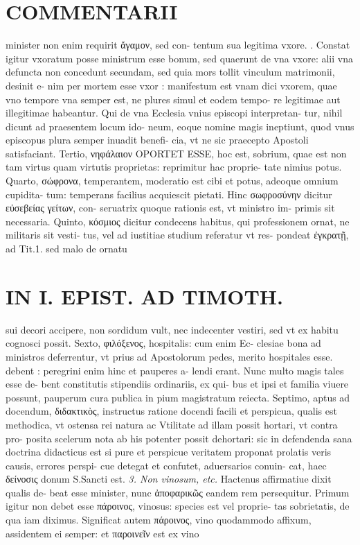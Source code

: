 \documentclass{article}
\begin{document}
\begin{pages}
\section*{COMMENTARII }\pstart minister non enim requirit ἄγαμον, sed con- tentum sua legitima vxore. .  \pend\pstart Constat igitur vxoratum posse ministrum esse bonum, sed quaerunt de vna vxore: alii vna defuncta non concedunt secundam, sed quia mors tollit vinculum matrimonii, desinit e- nim per mortem esse vxor : manifestum est vnam dici vxorem, quae vno tempore vna semper est, ne plures simul et eodem tempo- re legitimae aut illegitimae habeantur. Qui de vna Ecclesia vnius episcopi interpretan- tur, nihil dicunt ad praesentem locum ido- neum, eoque nomine magis ineptiunt, quod vnus episcopus plura semper inuadit benefi- cia, vt ne sic praecepto Apostoli satisfaciant.  \pend\pstart Tertio, νηφάλαιον OPORTET ESSE, hoc est, sobrium, quae est non tam virtus quam virtutis proprietas: reprimitur hac proprie- tate nimius potus.  \pend\pstart Quarto, σώφρονα, temperantem, moderatio est cibi et potus, adeoque omnium cupidita- tum: temperans facilius acquiescit pietati. Hinc σωφροσύνην dicitur εὐσεβείας γείτων, con- seruatrix quoque rationis est, vt ministro im- primis sit necessaria.  \pend\pstart Quinto, κόσμιος dicitur condecens habitus, qui professionem ornat, ne militaris sit vesti- tus, vel ad iustitiae studium referatur vt res- pondeat ἐγκρατῇ, ad Tit.1. sed malo de ornatu  \pend
\section*{IN I. EPIST. AD TIMOTH. }
\marginpar{[ p.65 ]}\pstart sui decori accipere, non sordidum vult, nec indecenter vestiri, sed vt ex habitu cognosci possit.  \pend\pstart Sexto, φιλόξενος, hospitalis: cum enim Ec- clesiae bona ad ministros deferrentur, vt prius ad Apostolorum pedes, merito hospitales esse. debent : peregrini enim hinc et pauperes a- lendi erant. Nunc multo magis tales esse de- bent constitutis stipendiis ordinariis, ex qui- bus et ipsi et familia viuere possunt, pauperum cura publica in pium magistratum reiecta. Septimo, aptus ad docendum, διδακτικὸς, instructus ratione docendi facili et perspicua, qualis est methodica, vt ostensa rei natura ac Vtilitate ad illam possit hortari, vt contra pro- posita scelerum nota ab his potenter possit dehortari: sic in defendenda sana doctrina didacticus est si pure et perspicue veritatem proponat prolatis veris causis, errores perspi- cue detegat et confutet, aduersarios conuin- cat, haec δείνοσις donum S.Sancti est.  \pend
\textit{3. Non vinosum, etc. }\pstart Hactenus affirmatiue dixit qualis de- beat esse minister, nunc ἀποφαρικῶς eandem rem persequitur. Primum igitur non debet esse πάροινος, vinosus: species est vel proprie- tas sobrietatis, de qua iam diximus. Significat autem πάροινος, vino quodammodo affixum, assidentem ei semper: et παροινεῖν est ex vino  \pend
\marginpar{[ p.66 ]}

\end{pages}
\end{document}
